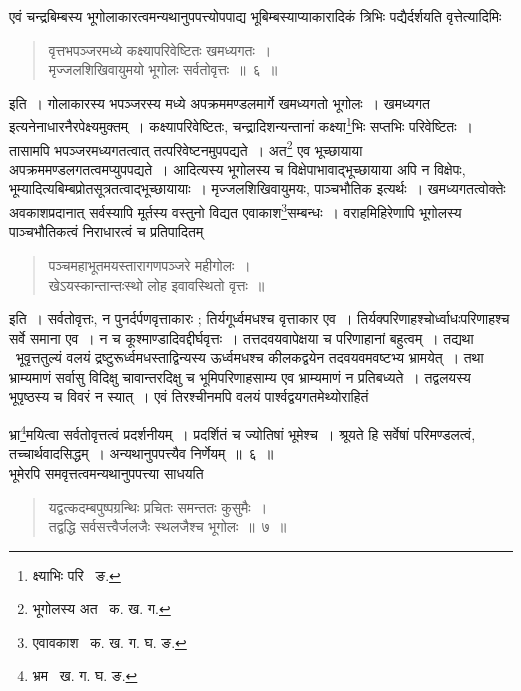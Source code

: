 \documentclass[11pt, openany]{book}
\begin{document}
एवं चन्द्रबिम्बस्य भूगोलाकारत्वमन्यथानुपपत्त्योपपाद्य भूबिम्बस्याप्याकारादिकं त्रिभिः पद्यैर्दर्शयति वृत्तेत्यादिमिः\textendash 
\begin{quote}
{\qt वृत्तभपञ्जरमध्ये कक्ष्यापरिवेष्टितः खमध्यगतः~। \\
 मृज्जलशिखिवायुमयो भूगोलः सर्वतोवृत्तः~॥~६~॥}
 \end{quote}
\begin{sloppypar}  
\indent इति~। गोलाकारस्य भपञ्जरस्य मध्ये अपक्रममण्डलमार्गे खमध्यगतो भूगोलः~। खमध्यगत इत्यनेनाधारनैरपेक्ष्यमुक्तम्~। कक्ष्यापरिवेष्टितः, चन्द्रादिशन्यन्तानां कक्ष्या\renewcommand{\thefootnote}{२}\footnote{क्ष्याभिः परि \textendash\ ङ.}भिः सप्तभिः परिवेष्टितः~। तासामपि भपञ्जरमध्यगतत्वात् तत्परिवेष्टनमुपपद्यते~। अत\renewcommand{\thefootnote}{३}\footnote{भूगोलस्य अत \textendash\ क. ख. ग.} एव भूच्छायाया अपक्रममण्डलगतत्वमप्युपपद्यते~। आदित्यस्य भूगोलस्य च विक्षेपाभावाद्भूच्छायाया अपि न विक्षेपः, भूम्यादित्यबिम्बप्रोतसूत्रतत्वाद्भूच्छायायाः~। मृज्जलशिखिवायुमयः, पाञ्चभौतिक इत्यर्थः~। खमध्यगतत्वोक्तेः अवकाशप्रदानात् सर्वस्यापि मूर्तस्य वस्तुनो विद्यत एवाकाश\renewcommand{\thefootnote}{४}\footnote{एवावकाश \textendash\ क. ख. ग. घ. ङ.}सम्बन्धः~। वराहमिहिरेणापि भूगोलस्य पाञ्चभौतिकत्वं निराधारत्वं च प्रतिपादितम्\textendash 
\end{sloppypar}

\begin{quote}
{\qt पञ्चमहाभूतमयस्तारागणपञ्जरे महीगोलः~। \\
खेऽयस्कान्तान्तःस्थो लोह इवावस्थितो वृत्तः~॥}
\end{quote}

\noindent इति~। सर्वतोवृत्तः, न पुनर्दर्पणवृत्ताकारः ; तिर्यगूर्ध्वमधश्च वृत्ताकार एव~। तिर्यक्परिणाहश्चोर्ध्वाधःपरिणाहश्च सर्वे समाना 
एव~। न च कूश्माण्डादिवद्दीर्घवृत्तः~। तत्तदवयवापेक्षया च परिणाहानां बहुत्वम्~। तद्यथा \textendash\ भूवृत्ततुल्यं वलयं द्रष्टुरूर्ध्वमधस्ताद्विन्यस्य ऊर्ध्वमधश्च कीलकद्वयेन तदवयवमवष्टभ्य भ्रामयेत्~। तथा भ्राम्यमाणं सर्वासु विदिक्षु चावान्तरदिक्षु च भूमिपरिणाहसाम्य एव भ्राम्यमाणं न प्रतिबध्यते~। तद्वलयस्य भूपृष्ठस्य च विवरं न स्यात्~। एवं तिरश्चीनमपि वलयं पार्श्वद्वयगतमेथ्योराहितं 

\newpage

\noindent भ्रा\renewcommand{\thefootnote}{१}\footnote{भ्रम \textendash\ ख. ग. घ. ङ.}मयित्वा सर्वतोवृत्तत्वं प्रदर्शनीयम्~। प्रदर्शितं च ज्योतिषां भूमेश्च~। श्रूयते हि सर्वेषां परिमण्डलत्वं, तच्चार्थवादसिद्धम्~। अन्यथानुपपत्त्यैव निर्णेयम्~॥~६~॥\\


\indent भूमेरपि समवृत्तत्वमन्यथानुपपत्त्या साधयति\textendash 
\begin{quote}

{\ab यद्वत्कदम्बपुष्पग्रन्थिः प्रचितः समन्ततः कुसुमैः~। \\
तद्वद्धि सर्वसत्त्वैर्जलजैः स्थलजैश्च भूगोलः~॥~७~॥} 
\end{quote}
\end{document}
